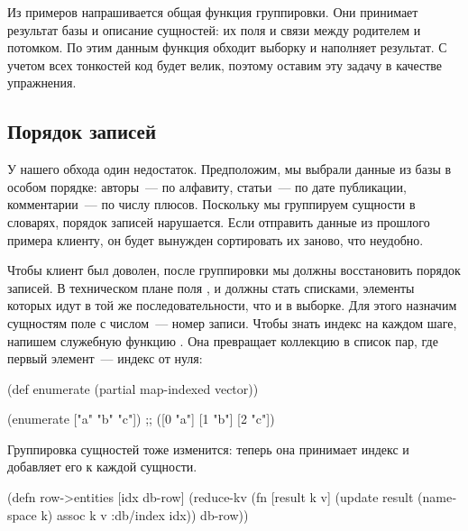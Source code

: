 Из примеров напрашивается общая функция группировки. Они принимает результат базы и описание сущностей: их поля и связи между родителем и потомком. По этим данным функция обходит выборку и наполняет результат. С учетом всех тонкостей код будет велик, поэтому оставим эту задачу в качестве упражнения.

\subsection{Порядок записей}


У нашего обхода один недостаток. Предположим, мы выбрали данные из базы в особом порядке: авторы~--- по алфавиту, статьи~--- по дате публикации, комментарии~--- по числу плюсов. Поскольку мы группируем сущности в словарях, порядок записей нарушается. Если отправить данные из прошлого примера клиенту, он будет вынужден сортировать их заново, что неудобно.

Чтобы клиент был доволен, после группировки мы должны восстановить порядок записей. В техническом плане поля ,  и  должны стать списками, элементы которых идут в той же последовательности, что и в выборке. Для этого назначим сущностям поле  с числом~--- номер записи. Чтобы знать индекс на каждом шаге, напишем служебную функцию . Она превращает коллекцию в список пар, где первый элемент~--- индекс от нуля:

\begin{english}
  \begin{clojure}
(def enumerate
  (partial map-indexed vector))

(enumerate ["a" "b" "c"])
;; ([0 "a"] [1 "b"] [2 "c"])
  \end{clojure}
\end{english}

Группировка сущностей тоже изменится: теперь она принимает индекс и добавляет его к каждой сущности.

\begin{english}
  \begin{clojure}
(defn row->entities [idx db-row]
  (reduce-kv
   (fn [result k v]
     (update result
             (namespace k)
             assoc
             k v
             :db/index idx))
   {}
   db-row))
  \end{clojure}
\end{english}

